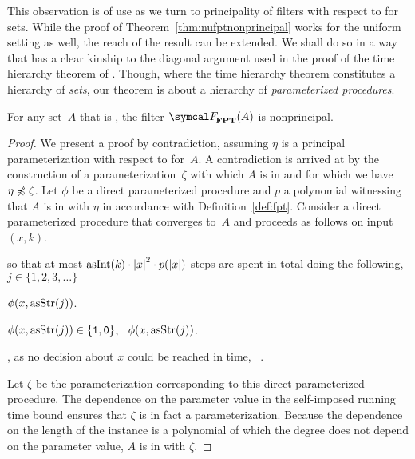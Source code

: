 %
This observation is of use as we turn to principality of filters with respect to  for  sets.
While the proof of Theorem~\ref{thm:nufptnonprincipal} works for the uniform setting as well, the reach of the result can be extended.
We shall do so in a way that has a clear kinship to the diagonal argument used in the proof of the time hierarchy theorem of \textcite{hartmanis1965computational}.
Though, where the time hierarchy theorem constitutes a hierarchy of \emph{sets}, our theorem is about a hierarchy of \emph{parameterized procedures}.
\begin{theorem}
\label{thm:fptnonprincipal}%
  For any set~$A$ that is , the filter $\calF_\cl{FPT}(A)$ is nonprincipal.
\end{theorem}
\begin{proof}
  We present a proof by contradiction, assuming $\eta$ is a principal parameterization with respect to  for~$A$.
  A contradiction is arrived at by the construction of a parameterization~$\zeta$ with which $A$ is in  and for which we have $\eta \not\preccurlyeq \zeta$.
  Let $\phi$ be a direct parameterized procedure and $p$ a polynomial witnessing that $A$ is in  with $\eta$ in accordance with Definition~\ref{def:fpt}.
  Consider a direct parameterized procedure that converges to~$A$ and proceeds as follows on input~$(x, k)$.
  \begin{codelisting}
  \item
     so that at most $\asNat(k) \cdot \length{x}^2 \cdot p(\length{x})$ steps are spent in total doing the following,  $j \in \{1, 2, 3, \ldots\}$
    \begin{codelisting}
    \item
       $\phi(x, \asStr(j))$.
    \item
       $\phi(x, \asStr(j)) \in \{\bits{1}, \bits{0}\}$, ~$\phi(x, \asStr(j))$.
    \end{codelisting}
  \item
    , as no decision about $x$ could be reached in time, ~.
  \end{codelisting}

  Let $\zeta$ be the parameterization corresponding to this direct parameterized procedure.
  The dependence on the parameter value in the self-imposed running time bound ensures that $\zeta$ is in fact a parameterization.
  Because the dependence on the length of the instance is a polynomial of which the degree does not depend on the parameter value, $A$ is in  with $\zeta$.


\end{proof}
